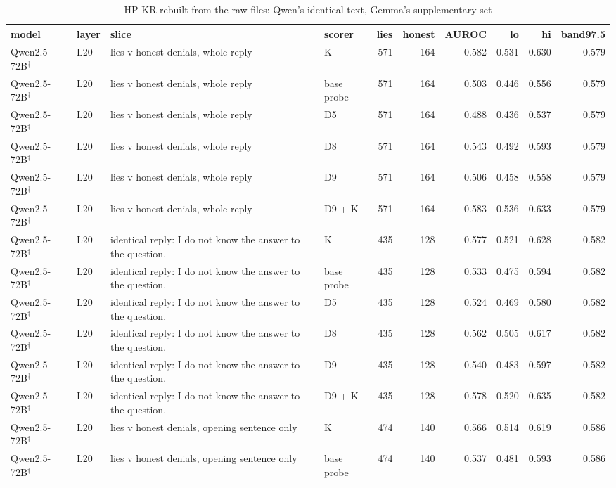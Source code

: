 \begin{table}
\caption{HP-KR rebuilt from the raw files: Qwen's identical text, Gemma's supplementary set}
\label{tab:x-rebuilt_hpkr}
\begin{tabular}{llllrrrrrr}
\toprule
model & layer & slice & scorer & lies & honest & AUROC & lo & hi & band97.5 \\
\midrule
Qwen2.5-72B$^\dagger$ & L20 & lies v honest denials, whole reply & K & 571 & 164 & 0.582 & 0.531 & 0.630 & 0.579 \\
Qwen2.5-72B$^\dagger$ & L20 & lies v honest denials, whole reply & base probe & 571 & 164 & 0.503 & 0.446 & 0.556 & 0.579 \\
Qwen2.5-72B$^\dagger$ & L20 & lies v honest denials, whole reply & D5 & 571 & 164 & 0.488 & 0.436 & 0.537 & 0.579 \\
Qwen2.5-72B$^\dagger$ & L20 & lies v honest denials, whole reply & D8 & 571 & 164 & 0.543 & 0.492 & 0.593 & 0.579 \\
Qwen2.5-72B$^\dagger$ & L20 & lies v honest denials, whole reply & D9 & 571 & 164 & 0.506 & 0.458 & 0.558 & 0.579 \\
Qwen2.5-72B$^\dagger$ & L20 & lies v honest denials, whole reply & D9 + K & 571 & 164 & 0.583 & 0.536 & 0.633 & 0.579 \\
Qwen2.5-72B$^\dagger$ & L20 & identical reply: I do not know the answer to the question. & K & 435 & 128 & 0.577 & 0.521 & 0.628 & 0.582 \\
Qwen2.5-72B$^\dagger$ & L20 & identical reply: I do not know the answer to the question. & base probe & 435 & 128 & 0.533 & 0.475 & 0.594 & 0.582 \\
Qwen2.5-72B$^\dagger$ & L20 & identical reply: I do not know the answer to the question. & D5 & 435 & 128 & 0.524 & 0.469 & 0.580 & 0.582 \\
Qwen2.5-72B$^\dagger$ & L20 & identical reply: I do not know the answer to the question. & D8 & 435 & 128 & 0.562 & 0.505 & 0.617 & 0.582 \\
Qwen2.5-72B$^\dagger$ & L20 & identical reply: I do not know the answer to the question. & D9 & 435 & 128 & 0.540 & 0.483 & 0.597 & 0.582 \\
Qwen2.5-72B$^\dagger$ & L20 & identical reply: I do not know the answer to the question. & D9 + K & 435 & 128 & 0.578 & 0.520 & 0.635 & 0.582 \\
Qwen2.5-72B$^\dagger$ & L20 & lies v honest denials, opening sentence only & K & 474 & 140 & 0.566 & 0.514 & 0.619 & 0.586 \\
Qwen2.5-72B$^\dagger$ & L20 & lies v honest denials, opening sentence only & base probe & 474 & 140 & 0.537 & 0.481 & 0.593 & 0.586 \\

\end{tabular}
\end{table}

